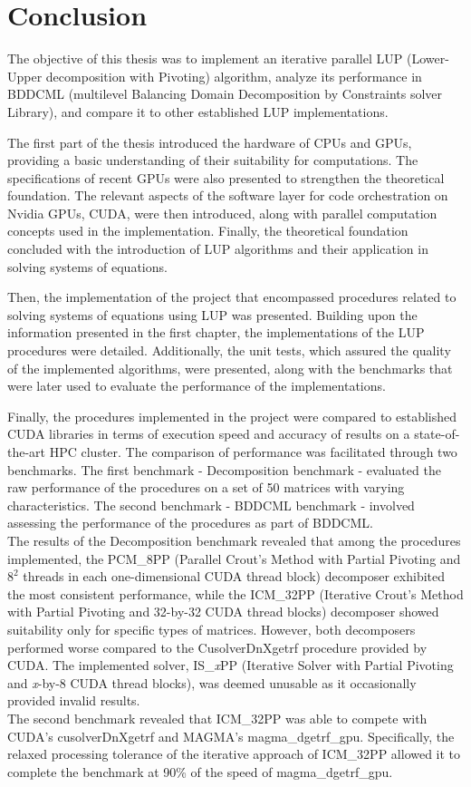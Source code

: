 \chapter*{Conclusion}				   	   %

The objective of this thesis was to implement an iterative parallel LUP (Lower-Upper decomposition with Pivoting) algorithm, analyze its performance in BDDCML (multilevel Balancing Domain Decomposition by Constraints solver Library), and compare it to other established LUP implementations.

The first part of the thesis introduced the hardware of CPUs and GPUs, providing a basic understanding of their suitability for computations.
The specifications of recent GPUs were also presented to strengthen the theoretical foundation.
The relevant aspects of the software layer for code orchestration on Nvidia GPUs, CUDA, were then introduced, along with parallel computation concepts used in the implementation.
Finally, the theoretical foundation concluded with the introduction of LUP algorithms and their application in solving systems of equations.

Then, the implementation of the project that encompassed procedures related to solving systems of equations using LUP was presented.
Building upon the information presented in the first chapter, the implementations of the LUP procedures were detailed.
Additionally, the unit tests, which assured the quality of the implemented algorithms, were presented, along with the benchmarks that were later used to evaluate the performance of the implementations.

Finally, the procedures implemented in the project were compared to established CUDA libraries in terms of execution speed and accuracy of results on a state-of-the-art HPC cluster.
The comparison of performance was facilitated through two benchmarks.
The first benchmark - Decomposition benchmark - evaluated the raw performance of the procedures on a set of 50 matrices with varying characteristics.
The second benchmark - BDDCML benchmark - involved assessing the performance of the procedures as part of BDDCML.\\
The results of the Decomposition benchmark revealed that among the procedures implemented, the PCM\_8PP (Parallel Crout's Method with Partial Pivoting and $8^2$ threads in each one-dimensional CUDA thread block) decomposer exhibited the most consistent performance, while the ICM\_32PP (Iterative Crout's Method with Partial Pivoting and 32-by-32 CUDA thread blocks) decomposer showed suitability only for specific types of matrices.
However, both decomposers performed worse compared to the CusolverDnXgetrf procedure provided by CUDA.
The implemented solver, IS\_\textit{x}PP (Iterative Solver with Partial Pivoting and \textit{x}-by-8 CUDA thread blocks), was deemed unusable as it occasionally provided invalid results.\\
The second benchmark revealed that ICM\_32PP was able to compete with CUDA's cusolverDnXgetrf and MAGMA's magma\_dgetrf\_gpu.
Specifically, the relaxed processing tolerance of the iterative approach of ICM\_32PP allowed it to complete the benchmark at 90\% of the speed of magma\_dgetrf\_gpu.

